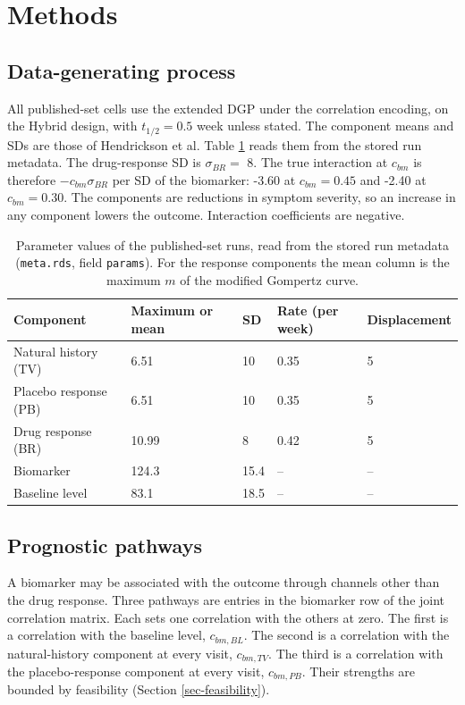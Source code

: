 \documentclass[
  11pt,
]{article}
\begin{document}
\section{Methods}\label{sec-methods}

\subsection{Data-generating process}\label{sec-dgp}

All published-set cells use the extended DGP under the correlation
encoding, on the Hybrid design, with \(t_{1/2} = 0.5\) week unless
stated. The component means and SDs are those of Hendrickson et al.
Table \ref{tab:tab-params} reads them from the stored run metadata.
The drug-response SD is \(\sigma_{BR} =\) 8. The true
interaction at \(c_{bm}\) is therefore \(-c_{bm}\sigma_{BR}\) per SD of
the biomarker: -3.60 at \(c_{bm} = 0.45\) and
-2.40 at \(c_{bm} = 0.30\). The components are reductions in
symptom severity, so an increase in any component lowers the
outcome. Interaction coefficients are negative.

\begin{table}
\centering
\caption{\label{tab:tab-params}Parameter values of the published-set runs, read from
      the stored run metadata (\texttt{meta.rds}, field
      \texttt{params}). For the
      response components the mean column is the maximum $m$ of the
      modified Gompertz curve.}
\centering
\fontsize{9}{11}\selectfont
\begin{tabular}[t]{lllll}
\toprule
Component & Maximum or mean & SD & Rate (per week) & Displacement\\
\midrule
Natural history (TV) & 6.51 & 10 & 0.35 & 5\\
Placebo response (PB) & 6.51 & 10 & 0.35 & 5\\
Drug response (BR) & 10.99 & 8 & 0.42 & 5\\
Biomarker & 124.3 & 15.4 & -- & --\\
Baseline level & 83.1 & 18.5 & -- & --\\
\bottomrule
\end{tabular}
\end{table}

\subsection{Prognostic pathways}\label{sec-pathways}

A biomarker may be associated with the outcome through channels other
than the drug response. Three pathways are entries in the biomarker
row of the joint correlation matrix. Each sets one correlation with
the others at zero. The first is a correlation with the baseline
level, \(c_{bm,BL}\). The second is a correlation with the
natural-history component at every visit, \(c_{bm,TV}\). The third is a
correlation with the placebo-response component at every visit,
\(c_{bm,PB}\). Their strengths are bounded by feasibility (Section
\ref{sec-feasibility}).
\end{document}
